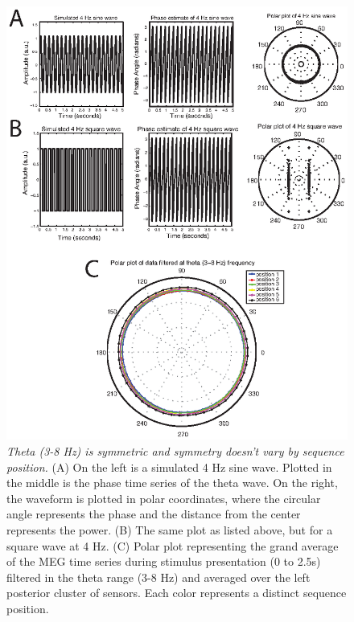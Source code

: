 \begin{figure}
  \centering
  \includegraphics[width=.75\textwidth]{figures/chapter3_suppfigure13.eps}
  \caption[Theta phase symmetry]{\textit{Theta (3-8 Hz) is symmetric and symmetry doesn’t vary by sequence position.} (A) On the left is a simulated 4 Hz sine wave.  Plotted in the middle is the phase time series of the theta wave.  On the right, the waveform is plotted in polar coordinates, where the circular angle represents the phase and the distance from the center represents the power. (B) The same plot as listed above, but for a square wave at 4 Hz. (C) Polar plot representing the grand average of the MEG time series during stimulus presentation (0 to 2.5s) filtered in the theta range (3-8 Hz) and averaged over the left posterior cluster of sensors.  Each color represents a distinct sequence position.}
  \label{chapter3_suppfigure13}
\end{figure}
